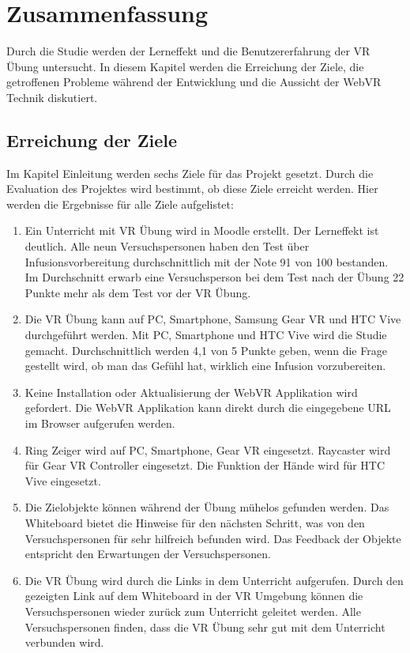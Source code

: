 \chapter{Zusammenfassung}

Durch die Studie werden der Lerneffekt und die Benutzererfahrung der VR Übung untersucht. In diesem Kapitel werden die Erreichung der Ziele, die getroffenen Probleme während der Entwicklung und die Aussicht der WebVR Technik diskutiert.

\section{Erreichung der Ziele}

Im Kapitel Einleitung werden sechs Ziele für das Projekt gesetzt. Durch die Evaluation des Projektes wird bestimmt, ob diese Ziele erreicht werden. Hier werden die Ergebnisse für alle Ziele aufgelistet:

\begin{enumerate}[labelsep=1ex]
	\renewcommand{\labelenumi}{\textbf{Z\theenumi.}}
	\item Ein Unterricht mit VR Übung wird in Moodle erstellt. Der Lerneffekt ist deutlich. Alle neun Versuchspersonen haben den Test über Infusionsvorbereitung durchschnittlich mit der Note 91 von 100 bestanden. Im Durchschnitt erwarb eine Versuchsperson bei dem Test nach der Übung 22 Punkte mehr als dem Test vor der VR Übung.
	
	\item Die VR Übung kann auf PC, Smartphone, Samsung Gear VR und HTC Vive durchgeführt werden. Mit PC, Smartphone und HTC Vive wird die Studie gemacht. Durchschnittlich werden 4,1 von 5 Punkte geben, wenn die Frage gestellt wird, ob man das Gefühl hat, wirklich eine Infusion vorzubereiten.
	
	\item Keine Installation oder Aktualisierung der WebVR Applikation wird gefordert. Die WebVR Applikation kann direkt durch die eingegebene URL im Browser aufgerufen werden.
	
	\item Ring Zeiger wird auf PC, Smartphone, Gear VR eingesetzt. Raycaster wird für Gear VR Controller eingesetzt. Die Funktion der Hände wird für HTC Vive eingesetzt.
	
	\item Die Zielobjekte können während der Übung mühelos gefunden werden. Das Whiteboard bietet die Hinweise für den nächsten Schritt, was von den Versuchspersonen für sehr hilfreich befunden wird. Das Feedback der Objekte entspricht den Erwartungen der Versuchspersonen.
	
	\item Die VR Übung wird durch die Links in dem Unterricht aufgerufen. Durch den gezeigten Link auf dem Whiteboard in der VR Umgebung können die Versuchspersonen wieder zurück zum Unterricht geleitet werden. Alle Versuchspersonen finden, dass die VR Übung sehr gut mit dem Unterricht verbunden wird.
	
\end{enumerate}

